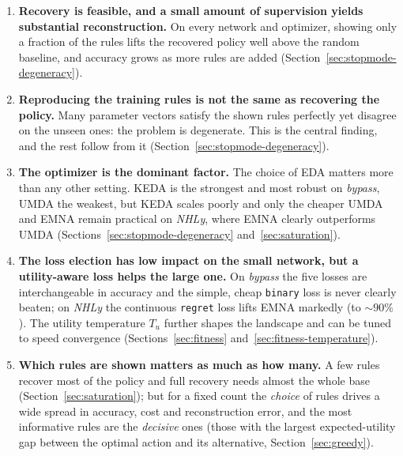 \begin{enumerate}
  \item \textbf{Recovery is feasible, and a small amount of supervision yields substantial reconstruction.} On every network and optimizer, showing only a fraction of the
        rules lifts the recovered policy well above the random baseline, and
        accuracy grows as more rules are added
        (Section~\ref{sec:stopmode-degeneracy}).

  \item \textbf{Reproducing the training rules is not the same as recovering
        the policy.} Many parameter vectors satisfy the shown rules perfectly
        yet disagree on the unseen ones: the problem is degenerate. This is the
        central finding, and the rest follow from it
        (Section~\ref{sec:stopmode-degeneracy}).

  \item \textbf{The optimizer is the dominant factor.} The choice of EDA
        matters more than any other setting. KEDA is the strongest and most
        robust on \emph{bypass}, UMDA the weakest, but KEDA scales poorly and
        only the cheaper UMDA and EMNA remain practical on \emph{NHLy}, where
        EMNA clearly outperforms UMDA
        (Sections~\ref{sec:stopmode-degeneracy} and~\ref{sec:saturation}).

    \item \textbf{The loss election has low impact on the small network, but a utility-aware loss helps the large one.} On \emph{bypass} the five
        losses are interchangeable in accuracy and the simple, cheap
        \texttt{binary} loss is never clearly beaten; on \emph{NHLy} the
        continuous \texttt{regret} loss lifts EMNA markedly (to $\sim\!90\%$).
        The utility temperature $T_u$ further shapes the landscape and can be
        tuned to speed convergence (Sections~\ref{sec:fitness}
        and~\ref{sec:fitness-temperature}).

  \item \textbf{Which rules are shown matters as much as how many.} A few rules
        recover most of the policy and full recovery needs almost the whole base
        (Section~\ref{sec:saturation}); but for a fixed count the \emph{choice}
        of rules drives a wide spread in accuracy, cost and reconstruction
        error, and the most informative rules are the \emph{decisive} ones (those with the largest expected-utility gap between the optimal action
        and its alternative, Section~\ref{sec:greedy}).


\end{enumerate}
